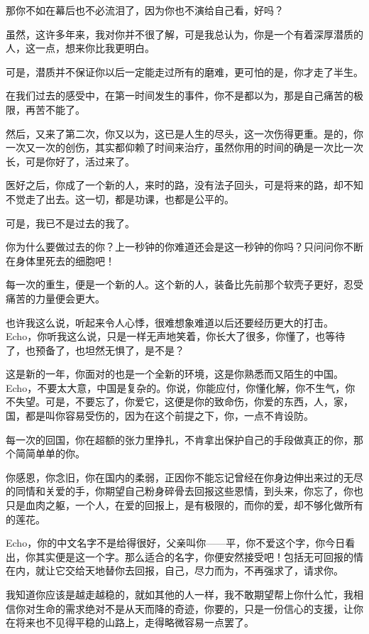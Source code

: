 \par 那你不如在幕后也不必流泪了，因为你也不演给自己看，好吗？
\par 虽然，这许多年来，我对你并不很了解，可是我总认为，你是一个有着深厚潜质的人，这一点，想来你比我更明白。
\par 可是，潜质并不保证你以后一定能走过所有的磨难，更可怕的是，你才走了半生。
\par 在我们过去的感受中，在第一时间发生的事件，你不是都以为，那是自己痛苦的极限，再苦不能了。
\par 然后，又来了第二次，你又以为，这已是人生的尽头，这一次伤得更重。是的，你一次又一次的创伤，其实都仰赖了时间来治疗，虽然你用的时间的确是一次比一次长，可是你好了，活过来了。
\par 医好之后，你成了一个新的人，来时的路，没有法子回头，可是将来的路，却不知不觉走了出去。这一切，都是功课，也都是公平的。
\par 可是，我已不是过去的我了。
\par 你为什么要做过去的你？上一秒钟的你难道还会是这一秒钟的你吗？只问问你不断在身体里死去的细胞吧！
\par 每一次的重生，便是一个新的人。这个新的人，装备比先前那个软壳子更好，忍受痛苦的力量便会更大。
\par 也许我这么说，听起来令人心悸，很难想象难道以后还要经历更大的打击。Echo，你听我这么说，只是一样无声地笑着，你长大了很多，你懂了，也等待了，也预备了，也坦然无惧了，是不是？
\par 这是新的一年，你面对的也是一个全新的环境，这是你熟悉而又陌生的中国。Echo，不要太大意，中国是复杂的。你说，你能应付，你懂化解，你不生气，你不失望。可是，不要忘了，你爱它，这便是你的致命伤，你爱的东西，人，家，国，都是叫你容易受伤的，因为在这个前提之下，你，一点不肯设防。
\par 每一次的回国，你在超额的张力里挣扎，不肯拿出保护自己的手段做真正的你，那个简简单单的你。
\par 你感恩，你念旧，你在国内的柔弱，正因你不能忘记曾经在你身边伸出来过的无尽的同情和关爱的手，你期望自己粉身碎骨去回报这些恩情，到头来，你忘了，你也只是血肉之躯，一个人，在爱的回报上，是有极限的，而你的爱，却不够化做所有的莲花。
\par Echo，你的中文名字不是给得很好，父亲叫你——平，你不爱这个字，你今日看出，你其实便是这一个字。那么适合的名字，你便安然接受吧！包括无可回报的情在内，就让它交给天地替你去回报，自己，尽力而为，不再强求了，请求你。
\par 我知道你应该是越走越稳的，就如其他的人一样，我不敢期望帮上你什么忙，我相信你对生命的需求绝对不是从天而降的奇迹，你要的，只是一份信心的支援，让你在将来也不见得平稳的山路上，走得略微容易一点罢了。
